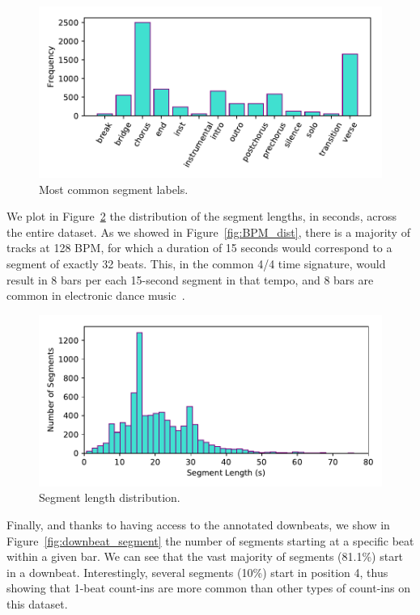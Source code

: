 \documentclass{article}
\begin{document}
\begin{figure}
    \centerline{\includegraphics[width=\columnwidth]{figs/SegmentLabels_distribution.pdf}}
    \caption{Most common segment labels.}
    \label{fig:seglabel_dist}
\end{figure}

We plot in Figure~\ref{fig:seglen_dist} the distribution of the segment lengths, in seconds, across the entire dataset.
As we showed in Figure~\ref{fig:BPM_dist}, there is a majority of tracks at 128 BPM, for which a duration of 15 seconds would correspond to a segment of exactly 32 beats.
This, in the common 4/4 time signature, would result in 8 bars per each 15-second segment in that tempo, and 8 bars are common in electronic dance music~\cite{Moelants2008}.

\begin{figure}
    \centerline{\includegraphics[width=\columnwidth]{figs/SegmentLength_distribution.pdf}}
    \caption{Segment length distribution.}
    \label{fig:seglen_dist}
\end{figure}

Finally, and thanks to having access to the annotated downbeats, we show in Figure~\ref{fig:downbeat_segment} the number of segments starting at a specific beat within a given bar.
We can see that the vast majority of segments (81.1\%) start in a downbeat.
Interestingly, several segments (10\%) start in position 4, thus showing that 1-beat count-ins are more common than other types of count-ins on this dataset.
\end{document}
